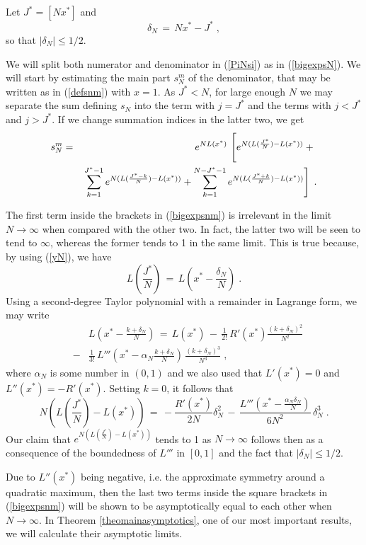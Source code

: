 \documentclass[12pt]{article}
\begin{document}
Let $J^{\ast}= [N x^{\ast}]$ and
\begin{equation}
\label{yN}
\delta_N \,=\, N x^{\ast}-J^{\ast} \;,
\end{equation}
so that $|\delta_N| \leq 1/2$. 

We will split both numerator and denominator in (\ref{PiNsi}) as in (\ref{bigexpsN}). We will start by estimating the main part $s_N^m$ of the denominator, that may be written as in (\ref{defsnm}) with $x=1$. As $J^{\ast}<N$, for large enough $N$ we may separate the sum defining $s_N$ into the term with $j=J^{\ast}$ and the terms with $j<J^{\ast}$ and $j>J^{\ast}$. If we change summation indices in the latter two, we get
\begin{eqnarray}
s_N^m&=&e^{NL(x^{\ast})} \, \left[ e^{N(L(\frac{J^{\ast}}{N})-L(x^{\ast}))} + \rule{0cm}{0.6cm} \right. \nonumber\\
&&\left. \sum_{k=1}^{J^{\ast}-1} e^{N(L(\frac{J^{\ast}-k}{N})-L(x^{\ast}))} + \sum_{k=1}^{N-J^{\ast}-1} e^{N(L(\frac{J^{\ast}+k}{N})-L(x^{\ast}))}\right]\;.\label{bigexpsnm}
\end{eqnarray} 

The first term inside the brackets in (\ref{bigexpsnm}) is irrelevant in the limit $N \rightarrow \infty$ when compared with the other two. In fact, the latter two will be seen to tend to $\infty$, whereas the former tends to 1 in the same limit. This is true because, by using (\ref{yN}), we have
\[L(\frac{J^{\ast}}{N})\,=\, L(x^{\ast}-\frac{\delta_N}{N}) \;.\]
Using a second-degree Taylor polynomial with a remainder in Lagrange form, we may write
\begin{eqnarray}  \label{taylorexp3}
&&L(x^{\ast}-\frac{k+\delta_N}{N})\,=\, L(x^{\ast}) \,-\, \frac{1}{2!}\,R'(x^{\ast}) \frac{(k+\delta_N)^2}{N^2}\\
&-& \frac{1}{3!}\,L'''(x^{\ast}- \alpha_N \frac{k+\delta_N}{N})\, \frac{(k+\delta_N)^3}{N^3}\nonumber\;,
\end{eqnarray}
where $\alpha_N$ is some number in $(0,1)$ and we also used that $L'(x^{\ast})=0$ and $L''(x^{\ast})=-R'(x^{\ast})$. Setting $k=0$, it follows that
\[N(L(\frac{J^{\ast}}{N})- L(x^{\ast})) \,=\, -\frac{R'(x^{\ast})}{2N}  \delta_N^2 \,-\, \frac{L'''(x^{\ast}-\frac{\alpha_N \delta_N}{N})}{6N^2} \, \delta_N^3\;.\]
Our claim that $e^{N(L(\frac{J^{\ast}}{N})-L(x^{\ast}))}$ tends to 1 as $N \rightarrow \infty$ follows then as a consequence of the boundedness of $L'''$ in $[0,1]$ and the fact that $|\delta_N| \leq 1/2$.

Due to $L''(x^{\ast})$ being negative, i.e. the approximate symmetry around a quadratic maximum, then the last two terms inside the square brackets in (\ref{bigexpsnm}) will be shown to be asymptotically equal to each other when $N \rightarrow \infty$. In Theorem \ref{theomainasymptotics}, one of our most important results, we will calculate their asymptotic limits. 
\end{document}

